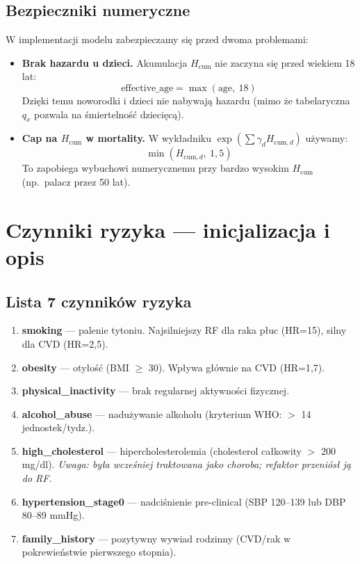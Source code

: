 \documentclass[11pt,a4paper]{article}
\newcommand{\cum}[1][]{H_{\mathrm{cum}#1}}
\begin{document}
\subsection{Bezpieczniki numeryczne}

W implementacji modelu zabezpieczamy się przed dwoma problemami:

\begin{itemize}[leftmargin=*]
  \item \textbf{Brak hazardu u dzieci.} Akumulacja $\cum$ nie zaczyna się przed wiekiem 18 lat:
  \[
  \text{effective\_age} = \max(\text{age},\ 18)
  \]
  Dzięki temu noworodki i dzieci nie nabywają hazardu (mimo że tabelaryczna $q_x$ pozwala na śmiertelność dziecięcą).

  \item \textbf{Cap na $\cum$ w mortality.} W wykładniku $\exp(\sum \gamma_d \cum[,d])$ używamy:
  \[
  \min(\cum[,d],\ 1{,}5)
  \]
  To zapobiega wybuchowi numerycznemu przy bardzo wysokim $\cum$ (np.\ palacz przez 50 lat).
\end{itemize}

\newpage
\section{Czynniki ryzyka --- inicjalizacja i opis}

\subsection{Lista 7 czynników ryzyka}

\begin{enumerate}[leftmargin=*, itemsep=4pt]
  \item \textbf{smoking} --- palenie tytoniu. Najsilniejszy RF dla raka płuc (HR=15), silny dla CVD (HR=2{,}5).
  \item \textbf{obesity} --- otyłość (BMI $\geq$ 30). Wpływa głównie na CVD (HR=1{,}7).
  \item \textbf{physical\_inactivity} --- brak regularnej aktywności fizycznej.
  \item \textbf{alcohol\_abuse} --- nadużywanie alkoholu (kryterium WHO: $>$ 14 jednostek/tydz.).
  \item \textbf{high\_cholesterol} --- hipercholesterolemia (cholesterol całkowity $>$ 200 mg/dl). \textit{Uwaga: była wcześniej traktowana jako choroba; refaktor przeniósł ją do RF.}
  \item \textbf{hypertension\_stage0} --- nadciśnienie pre-clinical (SBP 120--139 lub DBP 80--89 mmHg).
  \item \textbf{family\_history} --- pozytywny wywiad rodzinny (CVD/rak w pokrewieństwie pierwszego stopnia).
\end{enumerate}
\end{document}
